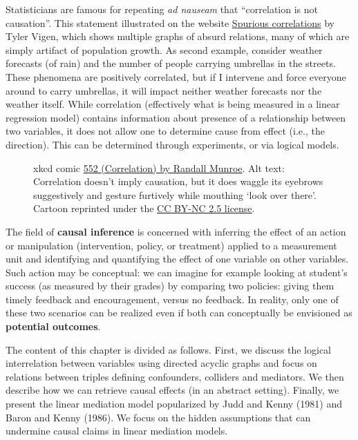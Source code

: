 \documentclass[
  11pt,
  letterpaper,
]{scrbook}
\theoremstyle{definition}
\theoremstyle{definition}
\theoremstyle{remark}
\begin{document}
Statisticians are famous for repeating \emph{ad nauseam} that
``correlation is not causation''. This statement illustrated on the
website \href{https://tylervigen.com/spurious-correlations}{Spurious
correlations} by Tyler Vigen, which shows multiple graphs of absurd
relations, many of which are simply artifact of population growth. As
second example, consider weather forecasts (of rain) and the number of
people carrying umbrellas in the streets. These phenomena are positively
correlated, but if I intervene and force everyone around to carry
umbrellas, it will impact neither weather forecasts nor the weather
itself. While correlation (effectively what is being measured in a
linear regression model) contains information about presence of a
relationship between two variables, it does not allow one to determine
cause from effect (i.e., the direction). This can be determined through
experiments, or via logical models.

\begin{figure}[ht!]


\caption{\label{fig-xkcd2569}xkcd comic \href{https://xkcd.com/552/}{552
(Correlation) by Randall Munroe}. Alt text: Correlation doesn't imply
causation, but it does waggle its eyebrows suggestively and gesture
furtively while mouthing `look over there'. Cartoon reprinted under the
\href{https://creativecommons.org/licenses/by-nc/2.5/}{CC BY-NC 2.5
license}.}

\end{figure}%

The field of \textbf{causal inference} is concerned with inferring the
effect of an action or manipulation (intervention, policy, or treatment)
applied to a measurement unit and identifying and quantifying the effect
of one variable on other variables. Such action may be conceptual: we
can imagine for example looking at student's success (as measured by
their grades) by comparing two policies: giving them timely feedback and
encouragement, versus no feedback. In reality, only one of these two
scenarios can be realized even if both can conceptually be envisioned as
\textbf{potential outcomes}.

The content of this chapter is divided as follows. First, we discuss the
logical interrelation between variables using directed acyclic graphs
and focus on relations between triples defining confounders, colliders
and mediators. We then describe how we can retrieve causal effects (in
an abstract setting). Finally, we present the linear mediation model
popularized by Judd and Kenny (1981) and Baron and Kenny (1986). We
focus on the hidden assumptions that can undermine causal claims in
linear mediation models.
\end{document}
